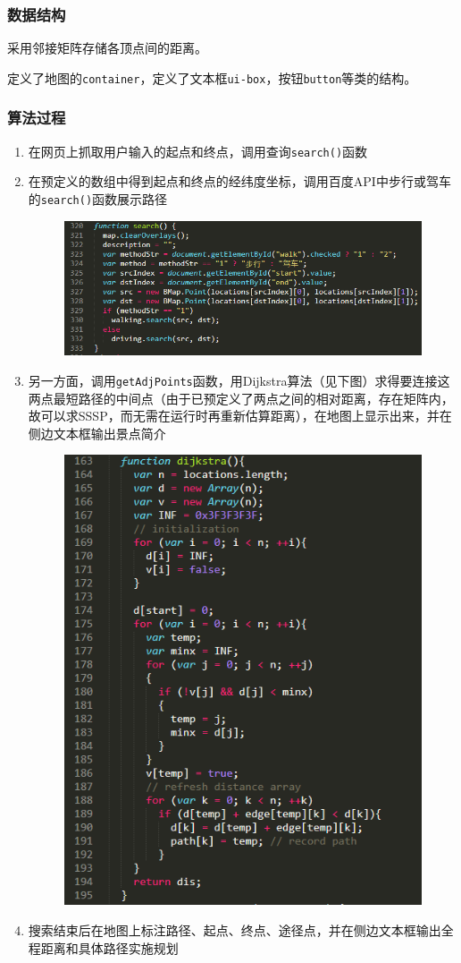 \documentclass[12pt,UTF8]{ctexart}
\begin{document}
\begin{spacing}{1.4}
\subsubsection{数据结构}
采用邻接矩阵存储各顶点间的距离。
\par 定义了地图的\verb'container'，定义了文本框\verb'ui-box'，按钮\verb'button'等类的结构。

\subsubsection{算法过程}
\begin{enumerate}
	\item 在网页上抓取用户输入的起点和终点，调用查询\verb'search()'函数
	\item 在预定义的数组中得到起点和终点的经纬度坐标，调用百度API中步行或驾车的\verb'search()'函数展示路径
\begin{figure}[H]
\centering
\includegraphics[width=0.6\linewidth]{fig/search.PNG}
\end{figure}
	\item 另一方面，调用\verb'getAdjPoints'函数，用Dijkstra算法（见下图）求得要连接这两点最短路径的中间点（由于已预定义了两点之间的相对距离，存在矩阵内，故可以求SSSP，而无需在运行时再重新估算距离），在地图上显示出来，并在侧边文本框输出景点简介
\begin{figure}[H]
\centering
\includegraphics[width=0.5\linewidth]{fig/dijkstra.PNG}
\end{figure}
	\item 搜索结束后在地图上标注路径、起点、终点、途径点，并在侧边文本框输出全程距离和具体路径实施规划
\end{enumerate}


\end{spacing}
\end{document}
